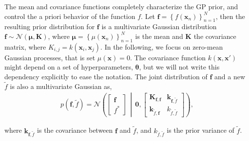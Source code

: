 \documentclass[onecolumn,a4paper,11pt]{article}
\begin{document}
The mean and covariance functions completely characterize the GP prior, and control the a priori behavior of the function $f$. Let $\bm{f}=\left\lbrace f(\bm{x}_n) \right\rbrace_{n=1}^N$, then the resulting prior distribution for $\bm{f}$ is a multivariate Gaussian distribution
$\bm{f} \sim \mathcal{N}(\bm{\mu}, \bm{K})$,
 where $\bm{\mu} = \left\lbrace \mu(\bm{x}_n) \right\rbrace_{n=1}^N$ is the mean and $\bm{K}$ the covariance matrix, where $K_{i,j}=k(\bm{x}_i,\bm{x}_j)$. In the following, we focus on zero-mean Gaussian processes, that is set $\mu(\bm{x}) = 0$. The covariance function $k(\bm{x}, \bm{x}')$ might depend on a set of hyperparameters, $\bm{\theta}$, but we will not write this dependency explicitly to ease the notation.
The joint distribution of $\bm{f}$ and a new $\tilde{f}$ is also a multivariate Gaussian as,
%
\begin{align*}
p(\bm{f}, \tilde{f})=\mathcal{N} \left( \left[ \begin{array}{cc}
\bm{f} \\ 
f^*
\end{array} \right] \,\middle|\, \bm{0},\left[ \begin{array}{cc}
\bm{K}_{\bm{f},\bm{f}} & \bm{k}_{\bm{f},\tilde{f}} \\ 
\bm{k}_{\tilde{f},\bm{f}} & k_{\tilde{f},\tilde{f}}
\end{array} \right] \right),
\end{align*} 

\noindent where $\bm{k}_{\bm{f},\tilde{f}}$ is the covariance between $\bm{f}$ and $\tilde{f}$, and $k_{\tilde{f},\tilde{f}}$ is the prior variance of $\tilde{f}$. %


 
\end{document}
